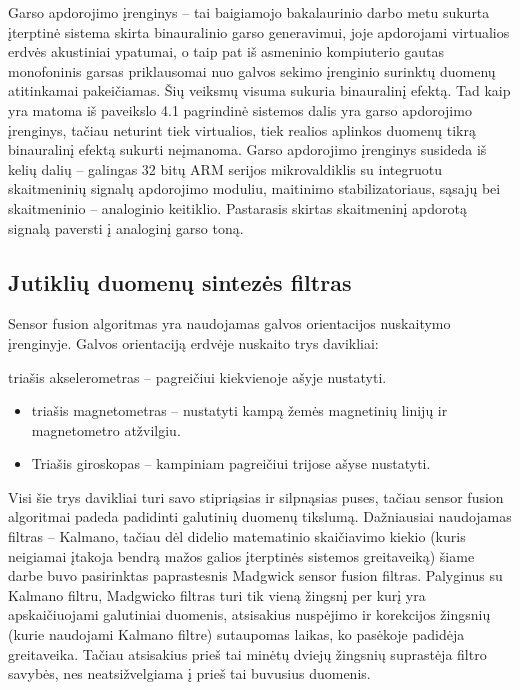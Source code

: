 \documentclass[]{vgtuef}
\begin{document}
Garso apdorojimo įrenginys – tai baigiamojo bakalaurinio darbo metu sukurta įterptinė sistema skirta binauralinio garso generavimui, joje apdorojami virtualios erdvės akustiniai ypatumai, o taip pat iš asmeninio kompiuterio gautas monofoninis garsas priklausomai nuo galvos sekimo įrenginio surinktų duomenų atitinkamai pakeičiamas. Šių veiksmų visuma sukuria binauralinį efektą. Tad kaip yra matoma iš paveikslo 4.1 pagrindinė sistemos dalis yra garso apdorojimo įrenginys, tačiau neturint tiek virtualios, tiek realios aplinkos duomenų tikrą binauralinį efektą sukurti neįmanoma. Garso apdorojimo įrenginys susideda iš kelių dalių – galingas 32 bitų ARM serijos mikrovaldiklis su integruotu skaitmeninių signalų apdorojimo moduliu, maitinimo stabilizatoriaus, sąsajų bei skaitmeninio – analoginio keitiklio. Pastarasis skirtas skaitmeninį apdorotą signalą paversti į analoginį garso toną. 

\subsection{Jutiklių duomenų sintezės filtras}

Sensor fusion algoritmas yra naudojamas galvos orientacijos nuskaitymo įrenginyje. Galvos orientaciją erdvėje nuskaito trys davikliai: 

triašis akselerometras – pagreičiui kiekvienoje ašyje nustatyti.
\begin{itemize}
\item triašis magnetometras – nustatyti kampą žemės magnetinių linijų ir magnetometro atžvilgiu.
\item Triašis giroskopas – kampiniam pagreičiui trijose ašyse nustatyti.
\end{itemize}

Visi šie trys davikliai turi savo stipriąsias ir silpnąsias puses, tačiau sensor fusion algoritmai padeda padidinti galutinių duomenų tikslumą. Dažniausiai naudojamas filtras – Kalmano, tačiau dėl didelio matematinio skaičiavimo kiekio (kuris neigiamai įtakoja bendrą mažos galios įterptinės sistemos greitaveiką) šiame darbe buvo pasirinktas paprastesnis Madgwick sensor fusion filtras. Palyginus su Kalmano filtru, Madgwicko filtras turi tik vieną žingsnį per kurį yra apskaičiuojami galutiniai duomenis, atsisakius nuspėjimo ir korekcijos žingsnių (kurie naudojami Kalmano filtre) sutaupomas laikas, ko pasėkoje padidėja greitaveika. Tačiau atsisakius prieš tai minėtų dviejų žingsnių suprastėja filtro savybės, nes neatsižvelgiama į prieš tai buvusius duomenis.
\end{document}
